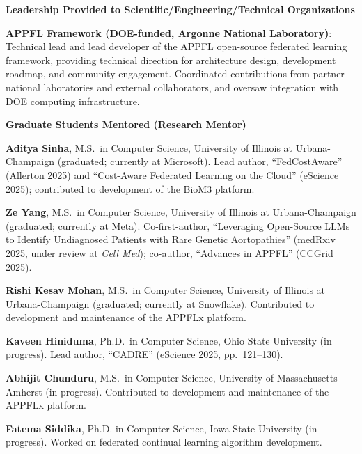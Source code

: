 \documentclass[letterpaper,11pt]{article}
\newcommand{\PubSection}[1]{%
  \vspace{6pt}\noindent\textbf{#1}\vspace{3pt}%
}
\begin{document}


\PubSection{Leadership Provided to Scientific/Engineering/Technical Organizations}
\begin{enumerate}[leftmargin=1cm, label={[\arabic*]}, itemsep=3pt]
  \small
  \item \textbf{APPFL Framework (DOE-funded, Argonne National Laboratory)}: Technical lead and lead developer of the APPFL open-source federated learning framework, providing technical direction for architecture design, development roadmap, and community engagement. Coordinated contributions from partner national laboratories and external collaborators, and oversaw integration with DOE computing infrastructure.
\end{enumerate}

\PubSection{Graduate Students Mentored (Research Mentor)}
\begin{enumerate}[leftmargin=1cm, label={[\arabic*]}, itemsep=3pt]
  \small
  \item \textbf{Aditya Sinha}, M.S.\ in Computer Science, University of Illinois at Urbana-Champaign (graduated; currently at Microsoft). Lead author, ``FedCostAware'' (Allerton 2025) and ``Cost-Aware Federated Learning on the Cloud'' (eScience 2025); contributed to development of the BioM3 platform.

  \item \textbf{Ze Yang}, M.S.\ in Computer Science, University of Illinois at Urbana-Champaign (graduated; currently at Meta). Co-first-author, ``Leveraging Open-Source LLMs to Identify Undiagnosed Patients with Rare Genetic Aortopathies'' (medRxiv 2025, under review at \textit{Cell Med}); co-author, ``Advances in APPFL'' (CCGrid 2025).

  \item \textbf{Rishi Kesav Mohan}, M.S.\ in Computer Science, University of Illinois at Urbana-Champaign (graduated; currently at Snowflake). Contributed to development and maintenance of the APPFLx platform.

  \item \textbf{Kaveen Hiniduma}, Ph.D.\ in Computer Science, Ohio State University (in progress). Lead author, ``CADRE'' (eScience 2025, pp.\ 121--130).

  \item \textbf{Abhijit Chunduru}, M.S.\ in Computer Science, University of Massachusetts Amherst (in progress). Contributed to development and maintenance of the APPFLx platform.

  \item \textbf{Fatema Siddika}, Ph.D. in Computer Science, Iowa State University (in progress). Worked on federated continual learning algorithm development.
\end{enumerate}
\end{document}
